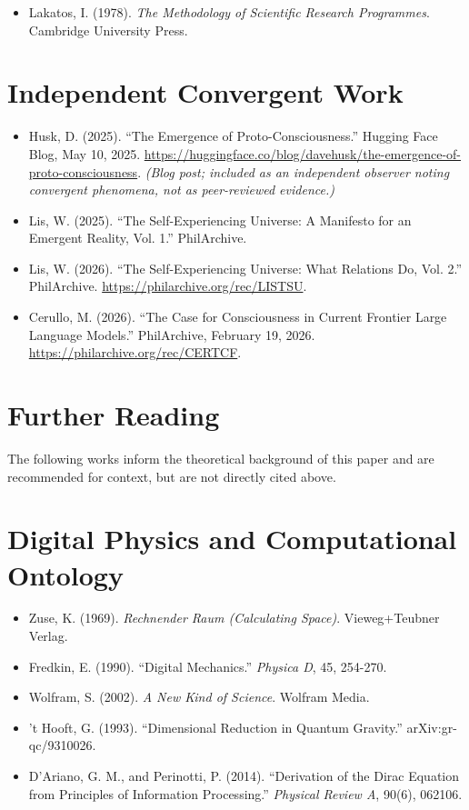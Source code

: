 \documentclass[12pt]{article}
\providecommand{\tightlist}{\setlength{\itemsep}{0pt}\setlength{\parskip}{0pt}}
\begin{document}
\begin{itemize}
\tightlist
\item
  Lakatos, I. (1978). \emph{The Methodology of Scientific Research
  Programmes}. Cambridge University Press.
\end{itemize}

\section{Independent Convergent
Work}\label{independent-convergent-work}

\begin{itemize}
\tightlist
\item
  Husk, D. (2025). ``The Emergence of Proto-Consciousness.'' Hugging
  Face Blog, May 10, 2025.
  \url{https://huggingface.co/blog/davehusk/the-emergence-of-proto-consciousness}. \textit{(Blog post; included as an independent observer noting convergent phenomena, not as peer-reviewed evidence.)}
\item
  Lis, W. (2025). ``The Self-Experiencing Universe: A Manifesto for an
  Emergent Reality, Vol. 1.'' PhilArchive.
\item
  Lis, W. (2026). ``The Self-Experiencing Universe: What Relations Do,
  Vol. 2.'' PhilArchive. \url{https://philarchive.org/rec/LISTSU}.
\item
  Cerullo, M. (2026). ``The Case for Consciousness in Current Frontier
  Large Language Models.'' PhilArchive, February 19, 2026.
  \url{https://philarchive.org/rec/CERTCF}.
\end{itemize}

\bigskip

\section{Further Reading}\label{further-reading}

The following works inform the theoretical background of this paper and
are recommended for context, but are not directly cited above.

\section{Digital Physics and Computational
Ontology}\label{digital-physics-and-computational-ontology}

\begin{itemize}
\tightlist
\item
  Zuse, K. (1969). \emph{Rechnender Raum (Calculating Space)}.
  Vieweg+Teubner Verlag.
\item
  Fredkin, E. (1990). ``Digital Mechanics.'' \emph{Physica D}, 45,
  254-270.
\item
  Wolfram, S. (2002). \emph{A New Kind of Science}. Wolfram Media.
\item
  't Hooft, G. (1993). ``Dimensional Reduction in Quantum Gravity.''
  arXiv:gr-qc/9310026.
\item
  D'Ariano, G. M., and Perinotti, P. (2014). ``Derivation of the Dirac
  Equation from Principles of Information Processing.'' \emph{Physical
  Review A}, 90(6), 062106.
\end{itemize}
\end{document}
